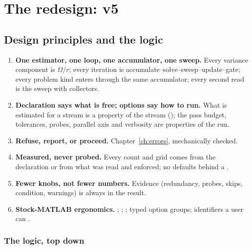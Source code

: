 \part{The redesign: \lsq{} v5}

\chapter{Design principles and the logic}
\label{ch:design}

\begin{principle}
\begin{enumerate}
\item \textbf{One estimator, one loop, one accumulator, one sweep.} Every variance component is $\Omega/r$; every iteration is accumulate--solve--sweep--update--gate; every problem kind enters through the same accumulator; every second read is the sweep with collectors.
\item \textbf{Declaration says what is free; options say how to run.} What is estimated for a stream is a property of the stream (); the pass budget, tolerances, probes, parallel axis and verbosity are properties of the run.
\item \textbf{Refuse, report, or proceed.} Chapter~\ref{ch:errors}, mechanically checked.
\item \textbf{Measured, never probed.} Every count and grid comes from the declaration or from what was read and enforced; no defaults behind a .
\item \textbf{Fewer knobs, not fewer numbers.} Evidence (redundancy, probes, skips, condition, warnings) is always in the result.
\item \textbf{Stock-MATLAB ergonomics.} ; ; ; typed option groups; identifiers a user can .
\end{enumerate}
\end{principle}

\section{The logic, top down}

